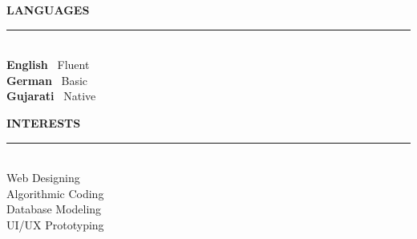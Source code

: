 \documentclass[10pt,a4paper]{article}
\newlength{\SW}\setlength{\SW}{6.3cm}    %
\newlength{\MW}\setlength{\MW}{14.7cm}   %
\newlength{\PH}\setlength{\PH}{29.7cm}   %
\newcommand{\sHead}[1]{%
  \vspace{10pt}%
  {\color{RoseGold}\bfseries\scriptsize\MakeUppercase{#1}}%
  \\[-3pt]{\color{RoseGoldLight}\rule{\linewidth}{1.2pt}}\\[5pt]}
\begin{document}
\begin{minipage}[t]{\SW}
\begin{minipage}[t]{\SW-22pt}
    \sHead{Languages}
    {\color{RoseGold}\bfseries\scriptsize English}\enspace
      {\color{white}\footnotesize\textbullet\ Fluent}\\[3pt]
      {\color{RoseGold}\bfseries\scriptsize German}\enspace
      {\color{white}\footnotesize\textbullet\ Basic}\\[3pt]      
    {\color{RoseGold}\bfseries\scriptsize Gujarati}\quad\enspace  
      {\color{white}\footnotesize\textbullet\ Native}
      
    \sHead{Interests}
    {\color{white}\footnotesize
      \faCode\enspace Web Designing\\[3.5pt]
      \faTrophy\enspace Algorithmic Coding\\[3.5pt]
      \faDatabase\enspace Database Modeling\\[3.5pt]
      \faPen\enspace UI/UX Prototyping
    }
  \end{minipage}
\end{minipage}%
\end{document}
